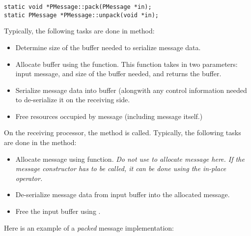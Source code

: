 \begin{verbatim}
static void *PMessage::pack(PMessage *in);
static PMessage *PMessage::unpack(void *in);
\end{verbatim}

Typically, the following tasks are done in  method:

\begin{itemize}
\item Determine size of the buffer needed to serialize message data.
\item Allocate buffer using the 
 function. This
function takes in two parameters: input message, and size of the
buffer needed, and returns the buffer.
\item Serialize message data into buffer (alongwith any control
information needed to de-serialize it on the receiving side.
\item Free resources occupied by message (including message itself.)  
\end{itemize}

On the receiving processor, the  method is
called. Typically, the following tasks are done in the 
method:

\begin{itemize}
\item Allocate message using  function. {\em Do not
use  to allocate message here. If the message constructor has
to be called, it can be done using the in-place  operator.}
\item De-serialize message data from input buffer into the allocated message.
\item Free the input buffer using .
\end{itemize}

Here is an example of a {\em packed} message implementation:

